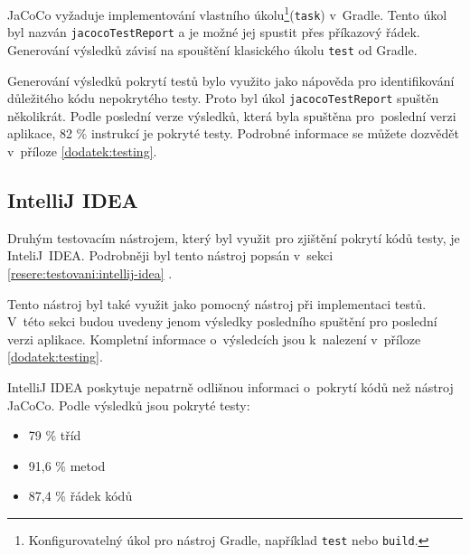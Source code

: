     JaCoCo vyžaduje implementování vlastního úkolu\footnote{Konfigurovatelný úkol pro nástroj Gradle, například \texttt{test} nebo \texttt{build}.}(\verb|task|) v~Gradle. Tento úkol byl nazván \verb|jacocoTestReport| a je možné jej spustit přes příkazový řádek. Generování výsledků závisí na spouštění klasického úkolu \verb|test| od Gradle. 
    
    Generování výsledků pokrytí testů bylo využito jako nápověda pro identifikování důležitého kódu nepokrytého testy. Proto byl úkol \verb|jacocoTestReport| spuštěn několikrát. Podle poslední verze výsledků, která byla spuštěna pro~poslední verzi aplikace, 82 \% instrukcí je pokryté testy. Podrobné informace se můžete dozvědět v~příloze \ref{dodatek:testing}.
    \subsection{IntelliJ IDEA}
    Druhým testovacím nástrojem, který byl využit pro zjištění pokrytí kódů testy, je InteliJ~IDEA. Podrobněji byl tento nástroj popsán v~sekci \ref{resere:testovani:intellij-idea} . 
    
    Tento nástroj byl také využit jako pomocný nástroj při implementaci testů. V~této sekci budou uvedeny jenom výsledky posledního spuštění pro poslední verzi aplikace. Kompletní informace o~výsledcích jsou k~nalezení v~příloze \ref{dodatek:testing}.
    
    IntelliJ IDEA poskytuje nepatrně odlišnou informaci o~pokrytí kódů než nástroj JaCoCo. Podle výsledků jsou pokryté testy:
    \begin{itemize}
            \item 79 \% tříd
            \item 91,6 \% metod
            \item 87,4 \% řádek kódů
    \end{itemize}